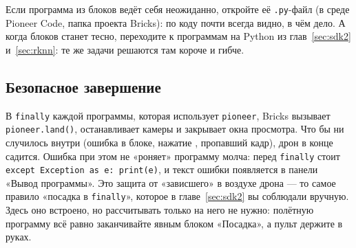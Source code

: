 \begin{hintbox}
Если программа из блоков ведёт себя неожиданно, откройте её \texttt{.py}-файл (в среде Pioneer Code, папка проекта Bricks): по коду почти всегда видно, в чём дело. А когда блоков станет тесно, переходите к программам на Python из глав~\ref{sec:sdk2} и~\ref{sec:rknn}: те же задачи решаются там короче и гибче.
\end{hintbox}

\subsection{Безопасное завершение}

В \verb|finally| каждой программы, которая использует \verb|pioneer|, Bricks вызывает \verb|pioneer.land()|, останавливает камеры и закрывает окна просмотра. Что бы ни случилось внутри (ошибка в блоке, нажатие , пропавший кадр), дрон в конце садится. Ошибка при этом не «роняет» программу молча: перед \verb|finally| стоит \verb|except Exception as e: print(e)|, и текст ошибки появляется в панели «Вывод программы». Это защита от «зависшего» в воздухе дрона --- то самое правило «посадка в \verb|finally|», которое в главе~\ref{sec:sdk2} вы соблюдали вручную. Здесь оно встроено, но рассчитывать только на него не нужно: полётную программу всё равно заканчивайте явным блоком «Посадка», а пульт держите в руках.



